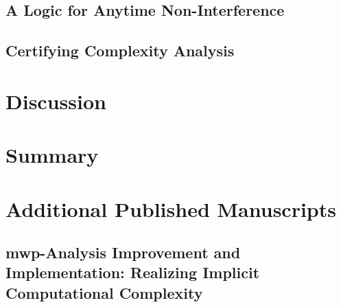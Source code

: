     \section{A Logic for Anytime Non-Interference}\label{sec:anytime}
    
    \clearpage

    \section{Certifying Complexity Analysis}\label{coqpl}
    
    \clearpage

\chapter{Discussion}\label{ch:discussion}


\chapter{Summary}\label{ch:summary}


\backmatter
\printbibliography[label=chap:references, title=References]
\let\printbibliography\relax

\appendix

\chapter{Additional Published Manuscripts}\label{additional-manuscripts}
\clearpage

    \section{mwp-Analysis Improvement and Implementation: Realizing Implicit
    Computational Complexity}\label{sec:fscd}
    
    \clearpage

